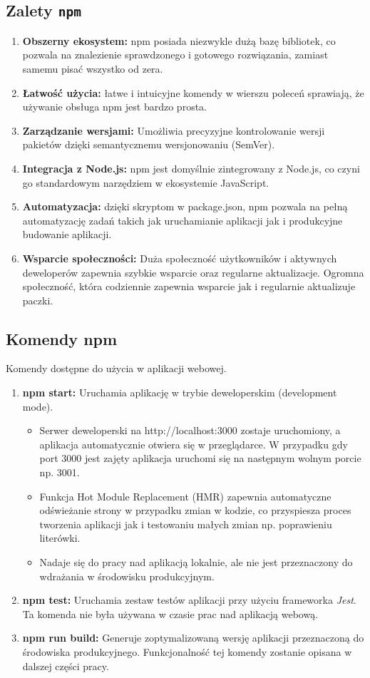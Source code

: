 \subsection{Zalety \texttt{npm}}
\begin{enumerate}
    \item \textbf{Obszerny ekosystem:} npm posiada niezwykle dużą bazę bibliotek, co pozwala na znalezienie sprawdzonego i gotowego rozwiązania, zamiast samemu pisać wszystko od zera.
    \item \textbf{Łatwość użycia:} łatwe i intuicyjne komendy w wierszu poleceń sprawiają, że używanie obsługa npm jest bardzo prosta.
    \item \textbf{Zarządzanie wersjami:} Umożliwia precyzyjne kontrolowanie wersji pakietów dzięki semantycznemu wersjonowaniu (SemVer).
    \item \textbf{Integracja z Node.js:} npm jest domyślnie zintegrowany z Node.js, co czyni go standardowym narzędziem w ekosystemie JavaScript.
    \item \textbf{Automatyzacja:} dzięki skryptom w package.json, npm pozwala na pełną automatyzację zadań takich jak uruchamianie aplikacji jak i produkcyjne budowanie aplikacji.
    \item \textbf{Wsparcie społeczności:} Duża społeczność użytkowników i aktywnych deweloperów zapewnia szybkie wsparcie oraz regularne aktualizacje.
    Ogromna społeczność, która codziennie zapewnia wsparcie jak i regularnie aktualizuje paczki.
\end{enumerate}
\subsection{Komendy npm}
Komendy dostępne do użycia w aplikacji webowej.
\begin{enumerate}
    \item \textbf{npm start:}  
    Uruchamia aplikację w trybie deweloperskim (development mode).  
    \begin{itemize}
        \item Serwer deweloperski na http://localhost:3000 zostaje uruchomiony, a aplikacja automatycznie otwiera się w przeglądarce. W przypadku gdy port 3000 jest zajęty aplikacja uruchomi się na następnym wolnym porcie np. 3001.
        \item Funkcja Hot Module Replacement (HMR) zapewnia automatyczne odświeżanie strony w przypadku zmian w kodzie, co przyspiesza proces tworzenia aplikacji jak i testowaniu małych zmian np. poprawieniu literówki.
        \item Nadaje się do pracy nad aplikacją lokalnie, ale nie jest przeznaczony do wdrażania w środowisku produkcyjnym.
    \end{itemize}
    \item \textbf{npm test:}  
    Uruchamia zestaw testów aplikacji przy użyciu frameworka \textit{Jest}. Ta komenda nie była używana w czasie prac nad aplikacją webową.
    \item \textbf{npm run build:}  
    Generuje zoptymalizowaną wersję aplikacji przeznaczoną do środowiska produkcyjnego. Funkcjonalność tej komendy zostanie opisana w dalszej części pracy.
\end{enumerate}

